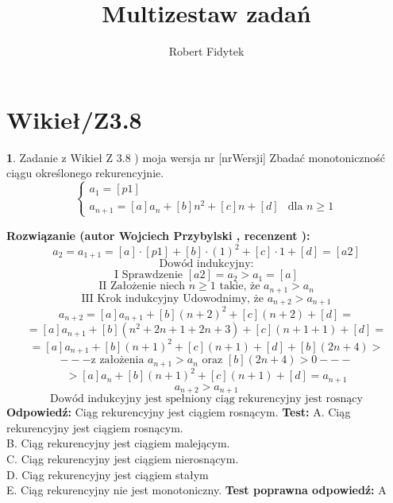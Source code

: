 \documentclass[12pt, a4paper]{article}
\title{Multizestaw zadań}
\author{Robert Fidytek}
\date{}
\theoremstyle{definition} %
\newtheorem{zad}{}
\newcommand{\kategoria}[1]{\section{#1}} %
\newcommand{\zadStart}[1]{\begin{zad}#1\newline} %
\newcommand{\zadStop}{\end{zad}}   %
\newcommand{\rozwStart}[2]{\noindent \textbf{Rozwiązanie (autor #1 , recenzent #2): }\newline} %
\newcommand{\rozwStop}{\newline}                                            %
\newcommand{\odpStart}{\noindent \textbf{Odpowiedź:}\newline}    %
\newcommand{\odpStop}{\newline}                                             %
\newcommand{\testStart}{\noindent \textbf{Test:}\newline} %
\newcommand{\testStop}{\newline} %
\newcommand{\kluczStart}{\noindent \textbf{Test poprawna odpowiedź:}\newline} %
\newcommand{\kluczStop}{\newline} %
\begin{document}
\maketitle


\kategoria{Wikieł/Z3.8}
\zadStart{Zadanie z Wikieł Z 3.8 ) moja wersja nr [nrWersji]}
Zbadać monotoniczność ciągu określonego rekurencyjnie.
$$
 \left\{ \begin{array}{ll}
a_{1}= [p1] & \\
a_{n+1}=[a]a_{n}+[b]n^{2}+[c]n+[d]  & \mbox{dla }n\geq1
\end{array} \right.
$$
\zadStop
\rozwStart{Wojciech Przybylski}{}
$$a_{2}=a_{1+1}=[a]\cdot[p1]+[b]\cdot(1)^{2}+[c]\cdot1+[d]=[a2] $$
$$\mbox{Dowód indukcyjny:}$$
$$\mbox{I Sprawdzenie } [a2]=a_{2}>a_{1}=[a]$$
$$\mbox{II Założenie niech }n\geq1 \mbox{ takie, że } a_{n+1}>a_{n}$$
$$\mbox{III Krok indukcyjny }\mbox{Udowodnimy, że } a_{n+2}>a_{n+1}$$
$$a_{n+2}=[a]a_{n+1}+[b](n+2)^{2}+[c](n+2)+[d]=$$
$$=[a]a_{n+1}+[b](n^{2}+2n+1+2n+3)+[c](n+1+1)+[d]=$$
$$=[a]a_{n+1}+[b](n+1)^{2}+[c](n+1)+[d]+[b](2n+4)>$$
$$---\mbox{z założenia }a_{n+1}>a_{n} \mbox{ oraz } [b](2n+4)>0---$$
$$>[a]a_{n}+[b](n+1)^{2}+[c](n+1)+[d]=a_{n+1}$$
$$a_{n+2}>a_{n+1}$$
$$\mbox{Dowód indukcyjny jest spełniony ciąg rekurencyjny jest rosnący}$$
\rozwStop
\odpStart
Ciąg rekurencyjny jest ciągiem rosnącym.
\odpStop
\testStart
A. Ciąg rekurencyjny jest ciągiem rosnącym.\\
B. Ciąg rekurencyjny jest ciągiem malejącym.\\
C. Ciąg rekurencyjny jest ciągiem nierosnącym.\\
D. Ciąg rekurencyjny jest ciągiem stałym\\
E. Ciąg rekurencyjny nie jest monotoniczny.
\testStop
\kluczStart
A
\kluczStop
\end{document}
